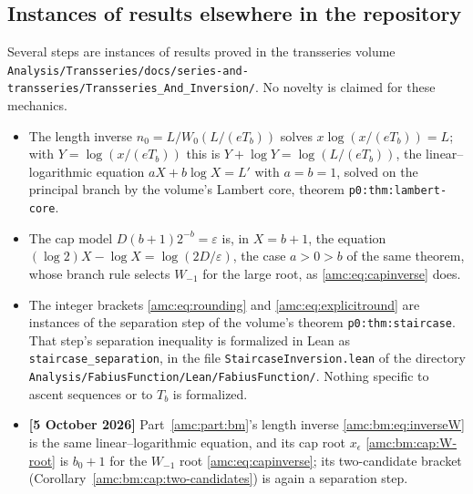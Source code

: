\documentclass[11pt,letterpaper]{article}
\theoremstyle{remark}\newtheorem{remark}[theorem]{Remark}
\newcommand{\repopath}[1]{\nolinkurl{#1}}
\begin{document}
\subsection*{Instances of results elsewhere in the repository}
\label{amc:guide:lambert}
Several steps are instances of results proved in the transseries volume \repopath{Analysis/Transseries/docs/series-and-transseries/Transseries_And_Inversion/}. No novelty is claimed for these mechanics.
\begin{itemize}
\item The length inverse $n_0=L/W_0(L/(eT_b))$ solves $x\log(x/(eT_b))=L$; with $Y=\log(x/(eT_b))$ this is $Y+\log Y=\log(L/(eT_b))$, the linear--logarithmic equation $aX+b\log X=L'$ with $a=b=1$, solved on the principal branch by the volume's Lambert core, theorem \texttt{p0:thm:lambert-core}.
\item The cap model $D(b+1)2^{-b}=\varepsilon$ is, in $X=b+1$, the equation $(\log2)X-\log X=\log(2D/\varepsilon)$, the case $a>0>b$ of the same theorem, whose branch rule selects $W_{-1}$ for the large root, as \eqref{amc:eq:capinverse} does.
\item The integer brackets \eqref{amc:eq:rounding} and \eqref{amc:eq:explicitround} are instances of the separation step of the volume's theorem \texttt{p0:thm:staircase}. That step's separation inequality is formalized in Lean as \texttt{staircase\_separation}, in the file \repopath{StaircaseInversion.lean} of the directory \repopath{Analysis/FabiusFunction/Lean/FabiusFunction/}. Nothing specific to ascent sequences or to $T_b$ is formalized.
\item \textbf{[5 October 2026]} Part~\ref{amc:part:bm}'s length inverse \eqref{amc:bm:eq:inverseW} is the same linear--logarithmic equation, and its cap root $x_\epsilon$ \eqref{amc:bm:cap:W-root} is $b_0+1$ for the $W_{-1}$ root \eqref{amc:eq:capinverse}; its two-candidate bracket (Corollary~\ref{amc:bm:cap:two-candidates}) is again a separation step.
\end{itemize}
\end{document}
